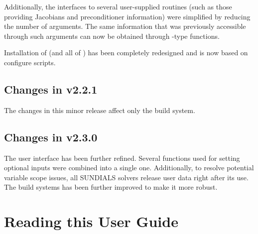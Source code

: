 Additionally, the interfaces to several user-supplied routines
(such as those providing Jacobians and preconditioner information) 
were simplified by reducing the number
of arguments. The same information that was previously accessible
through such arguments can now be obtained through {-type}
functions.

Installation of {\ida} (and all of {\sundials}) has been completely 
redesigned and is now based on configure scripts.

\subsection*{Changes in v2.2.1}

The changes in this minor {\sundials} release affect only the build system.

\subsection*{Changes in v2.3.0}

The user interface has been further refined. Several functions used
for setting optional inputs were combined into a single one.
Additionally, to resolve potential variable scope issues, all
SUNDIALS solvers release user data right after its use. The build
systems has been further improved to make it more robust.

\section{Reading this User Guide}\label{ss:reading}

